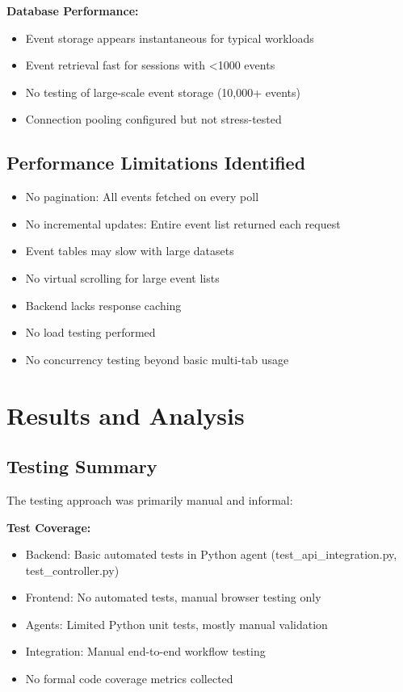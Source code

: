 \begin{itemize}
\textbf{Database Performance:}
\begin{itemize}
    \item Event storage appears instantaneous for typical workloads
    \item Event retrieval fast for sessions with <1000 events
    \item No testing of large-scale event storage (10,000+ events)
    \item Connection pooling configured but not stress-tested
\end{itemize}

\subsection{Performance Limitations Identified}

\begin{itemize}
    \item No pagination: All events fetched on every poll
    \item No incremental updates: Entire event list returned each request
    \item Event tables may slow with large datasets
    \item No virtual scrolling for large event lists
    \item Backend lacks response caching
    \item No load testing performed
    \item No concurrency testing beyond basic multi-tab usage
\end{itemize}

\section{Results and Analysis}

\subsection{Testing Summary}

The testing approach was primarily manual and informal:

\textbf{Test Coverage:}
\begin{itemize}
    \item Backend: Basic automated tests in Python agent (test\_api\_integration.py, test\_controller.py)
    \item Frontend: No automated tests, manual browser testing only
    \item Agents: Limited Python unit tests, mostly manual validation
    \item Integration: Manual end-to-end workflow testing
    \item No formal code coverage metrics collected
\end{itemize}


\end{itemize}
